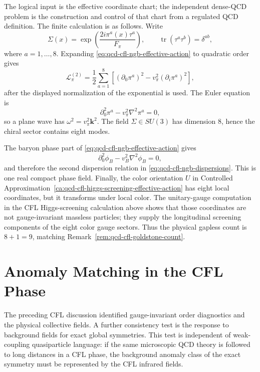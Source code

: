 The logical input is the effective coordinate chart; the independent dense-QCD
problem is the construction and control of that chart from a regulated QCD
definition.  The finite calculation is as follows.
Write
\[
  \Sigma(x)=\exp\!\left(\frac{2i\pi^a(x)\tau^a}{F_\pi}\right),
  \qquad
  \operatorname{tr}(\tau^a\tau^b)=\delta^{ab},
\]
where \(a=1,\ldots,8\).  Expanding
\eqref{eq:qcd-cfl-ngb-effective-action} to quadratic order gives
\[
  \mathcal L_{\pi}^{(2)}
  =
  \frac12\sum_{a=1}^8
  \left[
    (\partial_0\pi^a)^2
    -
    v_\pi^2(\partial_i\pi^a)^2
  \right],
\]
after the displayed normalization of the exponential is used.  The Euler
equation is
\[
  \partial_0^2\pi^a-v_\pi^2\nabla^2\pi^a=0,
\]
so a plane wave has \(\omega^2=v_\pi^2\mathbf k^2\).  The field
\(\Sigma\in SU(3)\) has dimension \(8\), hence the chiral sector contains
eight modes.

The baryon phase part of \eqref{eq:qcd-cfl-ngb-effective-action} gives
\[
  \partial_0^2\phi_B-v_B^2\nabla^2\phi_B=0,
\]
and therefore the second dispersion relation in
\eqref{eq:qcd-cfl-ngb-dispersions}.  This is one real compact phase field.
Finally, the color orientation \(U\) in
Controlled Approximation~\ref{ca:qcd-cfl-higgs-screening-effective-action}
has eight local coordinates, but it transforms under local color.  The
unitary-gauge computation in the CFL Higgs-screening calculation above shows
that those
coordinates are not gauge-invariant massless particles; they supply the
longitudinal screening components of the eight color gauge sectors.  Thus
the physical gapless count is \(8+1=9\), matching
Remark~\ref{rem:qcd-cfl-goldstone-count}.

\section{Anomaly Matching in the CFL Phase}
\label{sec:qcd-cfl-anomaly-matching}

The preceding CFL discussion identified gauge-invariant order diagnostics and
the physical collective fields.  A further consistency test is the response to
background fields for exact global symmetries.  This test is independent of
weak-coupling quasiparticle language: if the same microscopic QCD theory is
followed to long distances in a CFL phase, the background anomaly class of the
exact symmetry must be represented by the CFL infrared fields.

